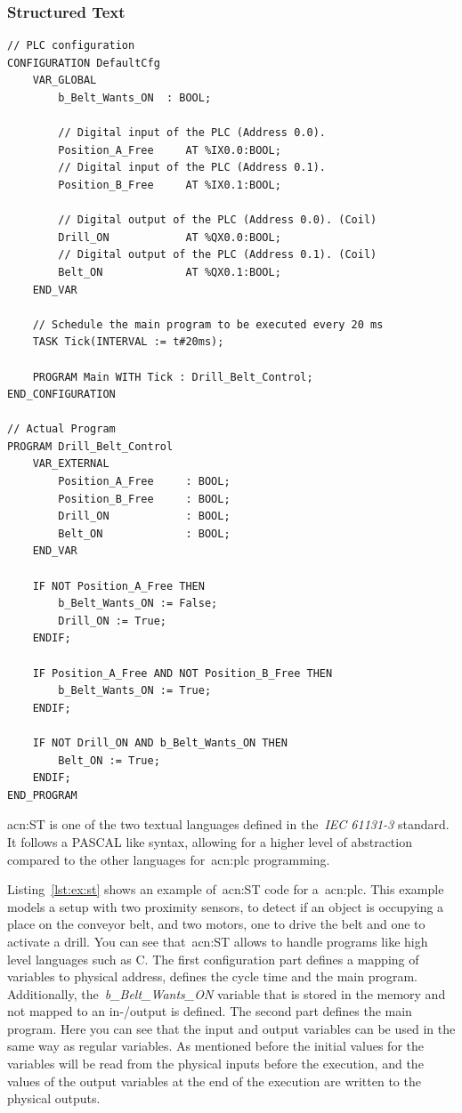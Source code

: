 \subsubsection{Structured Text}
\lstset{language=Pascal}
\begin{lstlisting}[caption={
Example of~\gls{acn:ST} code for controlling a conveyor belt and a drill.},label=lst:ex:st]
// PLC configuration
CONFIGURATION DefaultCfg
	VAR_GLOBAL
		b_Belt_Wants_ON  : BOOL;

		// Digital input of the PLC (Address 0.0).
		Position_A_Free     AT %IX0.0:BOOL;
		// Digital input of the PLC (Address 0.1).
		Position_B_Free     AT %IX0.1:BOOL;

		// Digital output of the PLC (Address 0.0). (Coil)
		Drill_ON            AT %QX0.0:BOOL;
		// Digital output of the PLC (Address 0.1). (Coil)
		Belt_ON             AT %QX0.1:BOOL;
	END_VAR

	// Schedule the main program to be executed every 20 ms
	TASK Tick(INTERVAL := t#20ms);

	PROGRAM Main WITH Tick : Drill_Belt_Control;
END_CONFIGURATION

// Actual Program
PROGRAM Drill_Belt_Control          
	VAR_EXTERNAL
		Position_A_Free     : BOOL;
		Position_B_Free     : BOOL;
		Drill_ON            : BOOL;
		Belt_ON             : BOOL;
	END_VAR

	IF NOT Position_A_Free THEN
		b_Belt_Wants_ON := False;
		Drill_ON := True;
	ENDIF;

	IF Position_A_Free AND NOT Position_B_Free THEN
		b_Belt_Wants_ON := True;
	ENDIF;

	IF NOT Drill_ON AND b_Belt_Wants_ON THEN
		Belt_ON := True;
	ENDIF;
END_PROGRAM
\end{lstlisting}

\acrfull{acn:ST} is one of the two textual languages defined in the~\textit{IEC 61131-3} standard.
It follows a PASCAL like syntax, allowing for a higher level of abstraction compared to the other languages for~\acrshort{acn:plc} programming.

Listing~\ref{lst:ex:st} shows an example of~\acrshort{acn:ST} code for a~\acrshort{acn:plc}.
This example models a setup with two proximity sensors, to detect if an object is occupying a place on the conveyor belt, and two motors, one to drive the belt and one to activate a drill.
You can see that~\acrshort{acn:ST} allows to handle programs like high level languages such as C.
The first configuration part defines a mapping of variables to physical address, defines the cycle time and the main program.
Additionally, the~\textit{b\_Belt\_Wants\_ON} variable that is stored in the memory and not mapped to an in-/output is defined.
The second part defines the main program.
Here you can see that the input and output variables can be used in the same way as regular variables.
As mentioned before the initial values for the variables will be read from the physical inputs before the execution, and the values of the output variables at the end of the execution are written to the physical outputs.

